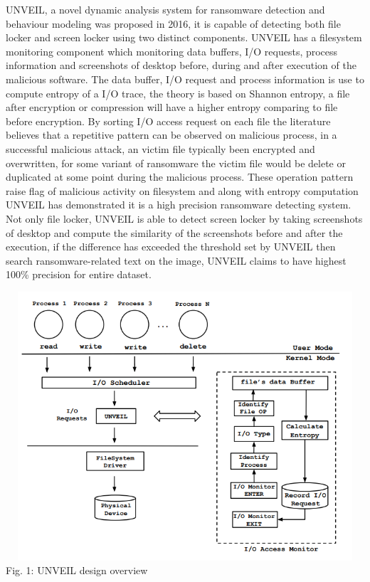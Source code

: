 \documentclass[]{PLR-ShaofengLiu}
\begin{document}
UNVEIL\cite{UN, UN2}, a novel dynamic analysis system for ransomware detection and behaviour modeling
was proposed in 2016, it is capable of detecting both file locker and screen locker using 
two distinct components. UNVEIL has a filesystem monitoring component which monitoring 
data buffers, I/O requests, process information and screenshots of desktop before, during 
and after execution of the malicious software. The data buffer, I/O request and process 
information is use to compute entropy of a I/O trace, the theory is based on Shannon 
entropy, a file after encryption or compression will have a higher entropy comparing to 
file before encryption. By sorting I/O access request on each file the literature 
believes that a repetitive pattern can be observed on malicious process, in a successful 
malicious attack, an victim file typically been encrypted and overwritten, for some 
variant of ransomware the victim file would be delete or duplicated at some point during 
the malicious process. These operation pattern raise flag of malicious activity on 
filesystem and along with entropy computation UNVEIL has demonstrated it is a high 
precision ransomware detecting system. Not only file locker, UNVEIL is able to detect 
screen locker by taking screenshots of desktop and compute the similarity of the 
screenshots before and after the execution, if the difference has exceeded the threshold 
set by UNVEIL then search ransomware-related text on the image, UNVEIL claims to have 
highest 100\% precision for entire dataset.

\includegraphics[width=16cm , height=10cm]{UNVEIL.png}
Fig. 1: UNVEIL design overview
\end{document}
